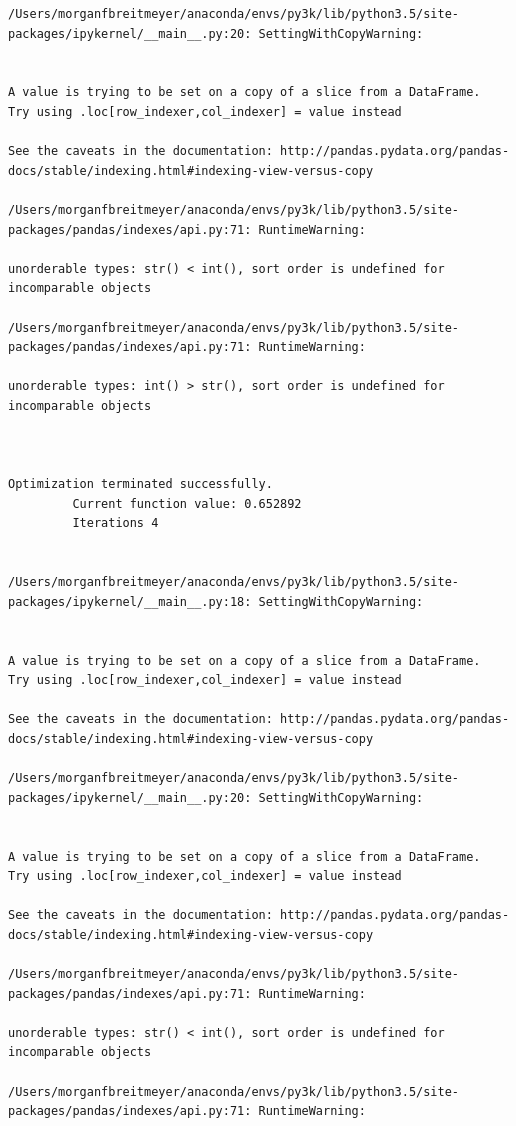 \begin{lstlisting}
/Users/morganfbreitmeyer/anaconda/envs/py3k/lib/python3.5/site-packages/ipykernel/__main__.py:20: SettingWithCopyWarning:


A value is trying to be set on a copy of a slice from a DataFrame.
Try using .loc[row_indexer,col_indexer] = value instead

See the caveats in the documentation: http://pandas.pydata.org/pandas-docs/stable/indexing.html#indexing-view-versus-copy

/Users/morganfbreitmeyer/anaconda/envs/py3k/lib/python3.5/site-packages/pandas/indexes/api.py:71: RuntimeWarning:

unorderable types: str() < int(), sort order is undefined for incomparable objects

/Users/morganfbreitmeyer/anaconda/envs/py3k/lib/python3.5/site-packages/pandas/indexes/api.py:71: RuntimeWarning:

unorderable types: int() > str(), sort order is undefined for incomparable objects



Optimization terminated successfully.
         Current function value: 0.652892
         Iterations 4


/Users/morganfbreitmeyer/anaconda/envs/py3k/lib/python3.5/site-packages/ipykernel/__main__.py:18: SettingWithCopyWarning:


A value is trying to be set on a copy of a slice from a DataFrame.
Try using .loc[row_indexer,col_indexer] = value instead

See the caveats in the documentation: http://pandas.pydata.org/pandas-docs/stable/indexing.html#indexing-view-versus-copy

/Users/morganfbreitmeyer/anaconda/envs/py3k/lib/python3.5/site-packages/ipykernel/__main__.py:20: SettingWithCopyWarning:


A value is trying to be set on a copy of a slice from a DataFrame.
Try using .loc[row_indexer,col_indexer] = value instead

See the caveats in the documentation: http://pandas.pydata.org/pandas-docs/stable/indexing.html#indexing-view-versus-copy

/Users/morganfbreitmeyer/anaconda/envs/py3k/lib/python3.5/site-packages/pandas/indexes/api.py:71: RuntimeWarning:

unorderable types: str() < int(), sort order is undefined for incomparable objects

/Users/morganfbreitmeyer/anaconda/envs/py3k/lib/python3.5/site-packages/pandas/indexes/api.py:71: RuntimeWarning:


\end{lstlisting}
